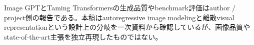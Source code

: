 \begin{claimboundary}
Image GPTとTaming Transformersの生成品質やbenchmark評価はauthor / project側の報告である。本稿はautoregressive image modelingと離散visual representationという設計上の分岐を一次資料から確認しているが、画像品質やstate-of-the-art主張を独立再現したものではない。\autocite{src-03b656c5d291,src-d46ff01d5c8d}
\end{claimboundary}
